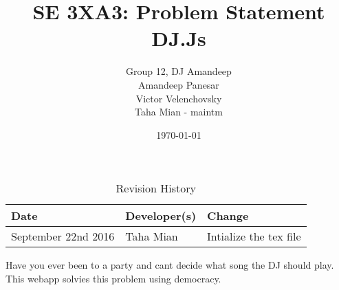 \documentclass[11pt,fleqn]{article}
\title{SE 3XA3: Problem Statement\\DJ.Js}
\author{Group 12, DJ Amandeep\\
Amandeep Panesar \\ Victor Velenchovsky \\ Taha Mian - maintm}
\date{\today}
\begin{document}
\begin{table}[hp]
\caption{Revision History} \label{TblRevisionHistory}
\begin{tabularx}{\textwidth}{llX}
\toprule
\textbf{Date} & \textbf{Developer(s)} & \textbf{Change}\\
\midrule
September 22nd 2016 & Taha Mian & Intialize the tex file\\

\bottomrule
\end{tabularx}
\end{table}
\maketitle

Have you ever been to a party and cant decide what song the DJ should play. This webapp solvies this problem using democracy.
\end{document}
